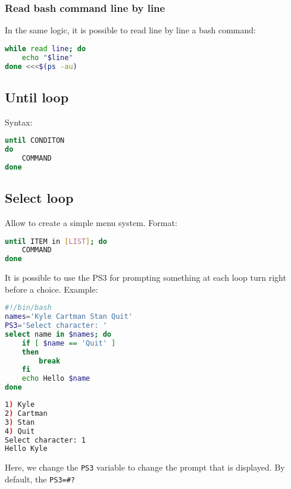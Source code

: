\documentclass{article}
\newcommand{\inlinecode}[1]{\colorbox{backcolour}{\footnotesize{\texttt{#1}}}}
\begin{document}
\subsubsection{Read bash command line by line}

In the same logic, it is possible to read line by line a bash command:

\begin{lstlisting}[style=command, language=bash]
while read line; do
    echo "$line"
done <<<$(ps -au)
\end{lstlisting}

\subsection{Until loop}

Syntax:

\begin{lstlisting}[style=command, language=bash]
until CONDITON
do
    COMMAND
done
\end{lstlisting}

\subsection{Select loop}

Allow to create a simple menu system. Format:

\begin{lstlisting}[style=command, language=bash]
until ITEM in [LIST]; do
    COMMAND
done
\end{lstlisting}

It is possible to use the PS3 for prompting something at each loop turn right before a choice. Example:

\begin{paracol}{2}

	\begin{lstlisting}[style=command, language=bash]
#!/bin/bash
names='Kyle Cartman Stan Quit'
PS3='Select character: '
select name in $names; do
    if [ $name == 'Quit' ]
    then
        break
    fi
    echo Hello $name
done
\end{lstlisting}

	\switchcolumn

	\begin{lstlisting}[style=terminal, language=bash]
1) Kyle
2) Cartman
3) Stan
4) Quit
Select character: 1
Hello Kyle
\end{lstlisting}

\end{paracol}
Here, we change the \inlinecode{PS3} variable to change the prompt that is displayed. By default, the \inlinecode{PS3=\#?}
\end{document}
